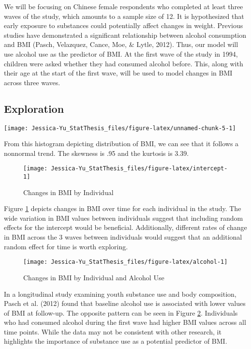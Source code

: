 \documentclass[12pt, twoside]{amherstthesis}
\begin{document}
We will be focusing on Chinese female respondents who completed at least three waves of the study, which amounts to a sample size of 12. It is hypothesized that early exposure to substances could potentially affect changes in weight. Previous studies have demonstrated a significant relationship between alcohol consumption and BMI (Pasch, Velazquez, Cance, Moe, \& Lytle, 2012). Thus, our model will use alcohol use as the predictor of BMI.
At the first wave of the study in 1994, children were asked whether they had consumed alcohol before. This, along with their age at the start of the first wave, will be used to model changes in BMI across three waves.

\hypertarget{exploration}{%
\subsection{Exploration}\label{exploration}}
\begin{center}\texttt{[image: Jessica-Yu\_StatThesis\_files/figure-latex/unnamed-chunk-5-1]} \end{center}

From this histogram depicting distribution of BMI, we can see that it follows a nonnormal trend. The skewness is .95 and the kurtosis is 3.39.
\begin{figure}

{\centering \texttt{[image: Jessica-Yu\_StatThesis\_files/figure-latex/intercept-1]} 

}

\caption{Changes in BMI by Individual}\label{fig:intercept}
\end{figure}
Figure \ref{fig:intercept} depicts changes in BMI over time for each individual in the study. The wide variation in BMI values between individuals suggest that including random effects for the intercept would be beneficial. Additionally, different rates of change in BMI across the 3 waves between individuals would suggest that an additional random effect for time is worth exploring.
\begin{figure}

{\centering \texttt{[image: Jessica-Yu\_StatThesis\_files/figure-latex/alcohol-1]} 

}

\caption{Changes in BMI by Individual and Alcohol Use}\label{fig:alcohol}
\end{figure}
In a longitudinal study examining youth substance use and body composition, Pasch et al. (2012) found that baseline alcohol use is associated with lower values of BMI at follow-up. The opposite pattern can be seen in Figure \ref{fig:alcohol}. Individuals who had consumed alcohol during the first wave had higher BMI values across all time points. While the data may not be consistent with other research, it highlights the importance of substance use as a potential predictor of BMI.
\end{document}
